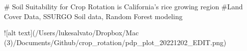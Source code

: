 # Soil Suitability for Crop Rotation is California's rice growing region
#Land Cover Data, SSURGO Soil data, Random Forest modeling



![alt text](/Users/lukesalvato/Dropbox/Mac (3)/Documents/Github/crop_rotation/pdp_plot_20221202_EDIT.png)